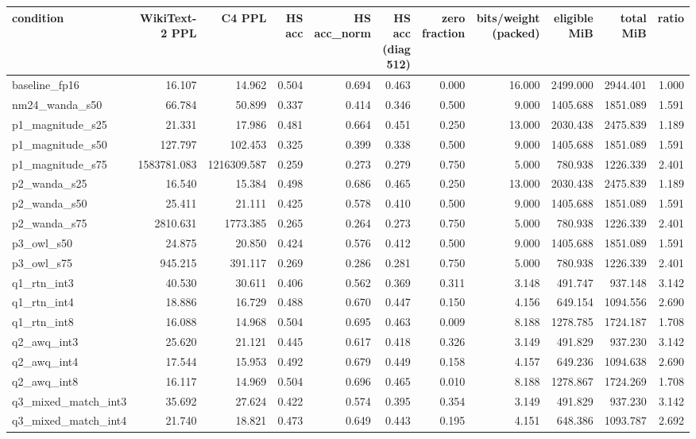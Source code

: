 \begin{tabular}{lrrrrrrrrrr}
\toprule
condition & WikiText-2 PPL & C4 PPL & HS acc & HS acc\_norm & HS acc (diag 512) & zero fraction & bits/weight (packed) & eligible MiB & total MiB & ratio \\
\midrule
baseline\_fp16 & 16.107 & 14.962 & 0.504 & 0.694 & 0.463 & 0.000 & 16.000 & 2499.000 & 2944.401 & 1.000 \\
nm24\_wanda\_s50 & 66.784 & 50.899 & 0.337 & 0.414 & 0.346 & 0.500 & 9.000 & 1405.688 & 1851.089 & 1.591 \\
p1\_magnitude\_s25 & 21.331 & 17.986 & 0.481 & 0.664 & 0.451 & 0.250 & 13.000 & 2030.438 & 2475.839 & 1.189 \\
p1\_magnitude\_s50 & 127.797 & 102.453 & 0.325 & 0.399 & 0.338 & 0.500 & 9.000 & 1405.688 & 1851.089 & 1.591 \\
p1\_magnitude\_s75 & 1583781.083 & 1216309.587 & 0.259 & 0.273 & 0.279 & 0.750 & 5.000 & 780.938 & 1226.339 & 2.401 \\
p2\_wanda\_s25 & 16.540 & 15.384 & 0.498 & 0.686 & 0.465 & 0.250 & 13.000 & 2030.438 & 2475.839 & 1.189 \\
p2\_wanda\_s50 & 25.411 & 21.111 & 0.425 & 0.578 & 0.410 & 0.500 & 9.000 & 1405.688 & 1851.089 & 1.591 \\
p2\_wanda\_s75 & 2810.631 & 1773.385 & 0.265 & 0.264 & 0.273 & 0.750 & 5.000 & 780.938 & 1226.339 & 2.401 \\
p3\_owl\_s50 & 24.875 & 20.850 & 0.424 & 0.576 & 0.412 & 0.500 & 9.000 & 1405.688 & 1851.089 & 1.591 \\
p3\_owl\_s75 & 945.215 & 391.117 & 0.269 & 0.286 & 0.281 & 0.750 & 5.000 & 780.938 & 1226.339 & 2.401 \\
q1\_rtn\_int3 & 40.530 & 30.611 & 0.406 & 0.562 & 0.369 & 0.311 & 3.148 & 491.747 & 937.148 & 3.142 \\
q1\_rtn\_int4 & 18.886 & 16.729 & 0.488 & 0.670 & 0.447 & 0.150 & 4.156 & 649.154 & 1094.556 & 2.690 \\
q1\_rtn\_int8 & 16.088 & 14.968 & 0.504 & 0.695 & 0.463 & 0.009 & 8.188 & 1278.785 & 1724.187 & 1.708 \\
q2\_awq\_int3 & 25.620 & 21.121 & 0.445 & 0.617 & 0.418 & 0.326 & 3.149 & 491.829 & 937.230 & 3.142 \\
q2\_awq\_int4 & 17.544 & 15.953 & 0.492 & 0.679 & 0.449 & 0.158 & 4.157 & 649.236 & 1094.638 & 2.690 \\
q2\_awq\_int8 & 16.117 & 14.969 & 0.504 & 0.696 & 0.465 & 0.010 & 8.188 & 1278.867 & 1724.269 & 1.708 \\
q3\_mixed\_match\_int3 & 35.692 & 27.624 & 0.422 & 0.574 & 0.395 & 0.354 & 3.149 & 491.829 & 937.230 & 3.142 \\
q3\_mixed\_match\_int4 & 21.740 & 18.821 & 0.473 & 0.649 & 0.443 & 0.195 & 4.151 & 648.386 & 1093.787 & 2.692 \\
\bottomrule
\end{tabular}
